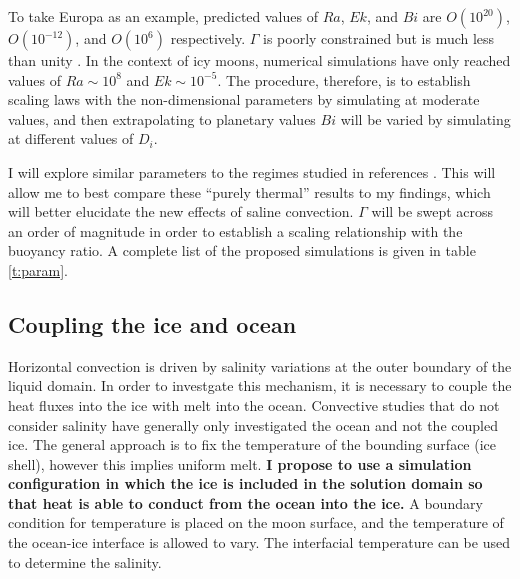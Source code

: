 \documentclass[12pt]{article}
\def\lb{\left(}
\def\rb{\right)}
\begin{document}

To take Europa as an example, predicted values of $Ra$,  $Ek$, and $Bi$ are $O\lb 10^{20}\rb $, $O\lb 10^{-12}\rb $, and $O\lb 10^{6}\rb $ respectively\citep{dL23}. $\Gamma$ is poorly constrained but is much less than unity \citep{yA21}. In the context of icy moons, numerical simulations have only reached values of $Ra \sim 10^{8}$ and $Ek \sim 10^{-5}$\citep{dL23}. 
The procedure, therefore, is to establish scaling laws with the non-dimensional parameters by simulating at moderate values, and then extrapolating to planetary values $Bi$ will be varied by simulating at different values of $D_{i}$.

I will explore similar parameters to the regimes studied in references \citep{dL23,kS19}. This will allow me to best compare these ``purely thermal'' results to my findings, which will better elucidate the new effects of saline convection. $\Gamma$ will be swept across an order of magnitude in order to establish a scaling relationship with the buoyancy ratio. A complete list of the proposed simulations is given in table \ref{t:param}. 
\subsection{Coupling the ice and ocean}

Horizontal convection is driven by salinity variations at the outer boundary of the liquid domain. In order to investgate this mechanism, it is necessary to couple the heat fluxes into the ice with melt into the ocean. 
Convective studies that do not consider salinity have generally only investigated the ocean\citep{kS19,dL23} and not the coupled ice. The general approach is to fix the temperature of the bounding surface (ice shell), however this implies uniform melt.
\textbf{I propose to use a simulation configuration in which the ice is included in the solution domain so that heat is able to conduct from the ocean into the ice.}
A boundary condition for temperature is placed on the moon surface, and the temperature of the ocean-ice interface is allowed to vary. The interfacial temperature can be used to determine the salinity\citep{wK22}.
\end{document}

